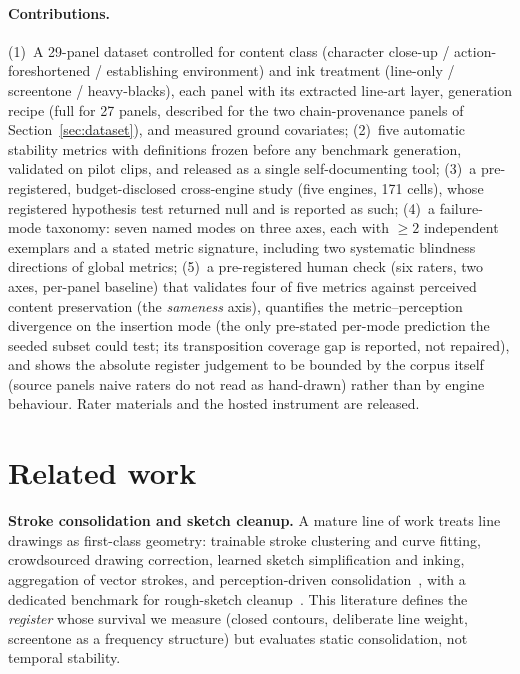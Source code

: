 \documentclass[11pt]{article}
\begin{document}
\paragraph{Contributions.}
(1)~A 29-panel dataset controlled for content class (character close-up /
action-foreshortened / establishing environment) and ink treatment
(line-only / screentone / heavy-blacks), each panel with its extracted
line-art layer, generation recipe (full for 27 panels, described for the two
chain-provenance panels of Section~\ref{sec:dataset}), and measured ground
covariates;
(2)~five automatic stability metrics with definitions frozen before any
benchmark generation, validated on pilot clips, and released as a single
self-documenting tool;
(3)~a pre-registered, budget-disclosed cross-engine study (five engines, 171
cells), whose registered hypothesis test returned null and is reported as
such;
(4)~a failure-mode taxonomy: seven named modes on three axes, each with
$\geq 2$ independent exemplars and a stated metric signature, including two
systematic blindness directions of global metrics;
(5)~a pre-registered human check (six raters, two axes, per-panel
baseline) that validates four of five metrics against perceived content
preservation (the \emph{sameness} axis), quantifies the metric--perception divergence on the insertion mode (the
only pre-stated per-mode prediction the seeded subset could test; its
transposition coverage gap is reported, not repaired), and shows the
absolute register judgement to be bounded by the corpus itself (source panels
naive raters do not read as hand-drawn) rather than by engine behaviour. Rater materials and the hosted instrument are
released.

\section{Related work}
\label{sec:related}

\textbf{Stroke consolidation and sketch cleanup.} A mature line of work
treats line drawings as first-class geometry: trainable stroke clustering
and curve fitting, crowdsourced drawing correction, learned sketch
simplification and inking, aggregation of vector strokes, and
perception-driven
consolidation~\cite{orbay2011beautification,limpaecher2013crowd,%
simoserra2016simplify,simoserra2018mastering,simoserra2018inker,%
liu2018strokeaggregator,pagurek2021strokestrip,liu2023stripmaker,%
yan2024vectorization,yu2024sketchbeaut}, with a dedicated benchmark for
rough-sketch cleanup~\cite{yan2020cleanup}. This literature defines the
\emph{register} whose survival we measure (closed contours, deliberate
line weight, screentone as a frequency structure) but evaluates static
consolidation, not temporal stability.
\end{document}
